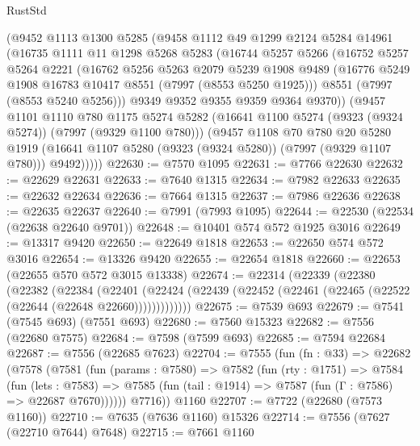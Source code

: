 \begin{lexlean}{RustStd}
\begin{coremodule}
{\begin{coremodule}
{{{{{{{{{{{{{{{{{{{{{{{{{{{{{{{{{{{{{{{{{{{    (@9452
      @1113
      @1300
      @5285
      (@9458
        @1112
        @49
        @1299
        @2124
        @5284
        @14961
        (@16735
          @1111
          @11
          @1298
          @5268
          @5283
          (@16744
            @5257
            @5266
            (@16752
              @5257
              @5264
              @2221
              (@16762
                @5256
                @5263
                @2079
                @5239
                @1908
                @9489
                (@16776 @5249 @1908 @16783 @10417 @8551 (@7997 (@8553 @5250 @1925)))
                @8551
                (@7997 (@8553 @5240 @5256)))
              @9349
              @9352
              @9355
              @9359
              @9364
              @9370))
          (@9457
            @1101
            @1110
            @780
            @1175
            @5274
            @5282
            (@16641 @1100 @5274 (@9323 (@9324 @5274)) (@7997 (@9329 @1100 @780)))
            (@9457
              @1108
              @70
              @780
              @20
              @5280
              @1919
              (@16641 @1107 @5280 (@9323 (@9324 @5280)) (@7997 (@9329 @1107 @780)))
              @9492)))))
@22630 := @7570 @1095
@22631 := @7766 @22630
@22632 := @22629 @22631
@22633 := @7640 @1315
@22634 := @7982 @22633
@22635 := @22632 @22634
@22636 := @7664 @1315
@22637 := @7986 @22636
@22638 := @22635 @22637
@22640 := @7991 (@7993 @1095)
@22644 := @22530 (@22534 (@22638 @22640 @9701))
@22648 := @10401 @574 @572 @1925 @3016
@22649 := @13317 @9420
@22650 := @22649 @1818
@22653 := @22650 @574 @572 @3016
@22654 := @13326 @9420
@22655 := @22654 @1818
@22660 := @22653 (@22655 @570 @572 @3015 @13338)
@22674 := @22314
    (@22339
      (@22380
        (@22382
          (@22384
            (@22401
              (@22424 (@22439 (@22452 (@22461 (@22465 (@22522 (@22644 (@22648 @22660)))))))))))))
@22675 := @7539 @693
@22679 := @7541 (@7545 @693) (@7551 @693)
@22680 := @7560 @15323
@22682 := @7556 (@22680 @7575)
@22684 := @7598 (@7599 @693)
@22685 := @7594 @22684
@22687 := @7556 (@22685 @7623)
@22704 := @7555
    (fun (fn : @33) =>
    @22682
      (@7578
        (@7581
          (fun (params : @7580) =>
          @7582
            (fun (rty : @1751) =>
            @7584
              (fun (lets : @7583) =>
              @7585 (fun (tail : @1914) => @7587 (fun (Γ : @7586) => @22687 @7670))))))
        @7716))
    @1160
@22707 := @7722 (@22680 (@7573 @1160))
@22710 := @7635 (@7636 @1160) @15326
@22714 := @7556 (@7627 (@22710 @7644) @7648)
@22715 := @7661 @1160
}}}}}}}}}}}}}}}}}}}}}}}}}}}}}}}}}}}}}}}}}}}
\end{coremodule}}
\end{coremodule}
\end{lexlean}

